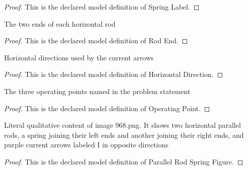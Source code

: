 \begin{proof}
  This is the declared model definition of Spring Label.
\end{proof}
\begin{definition}
  \label{def:physics:phyx-mini-0968:phyxminiproblems-problemphyxmini0968-rodend}
  The two ends of each horizontal rod
\end{definition}
\begin{proof}
  This is the declared model definition of Rod End.
\end{proof}
\begin{definition}
  \label{def:physics:phyx-mini-0968:phyxminiproblems-problemphyxmini0968-horizontaldirection}
  Horizontal directions used by the current arrows
\end{definition}
\begin{proof}
  This is the declared model definition of Horizontal Direction.
\end{proof}
\begin{definition}
  \label{def:physics:phyx-mini-0968:phyxminiproblems-problemphyxmini0968-operatingpoint}
  The three operating points named in the problem statement
\end{definition}
\begin{proof}
  This is the declared model definition of Operating Point.
\end{proof}
\begin{definition}
  \label{def:physics:phyx-mini-0968:phyxminiproblems-problemphyxmini0968-parallelrodspringfigure}
  Literal qualitative content of image 968.png. It shows two horizontal parallel rods, a spring joining their left ends and another joining their right ends, and purple current arrows labeled I in opposite directions
\end{definition}
\begin{proof}
  This is the declared model definition of Parallel Rod Spring Figure.
\end{proof}

